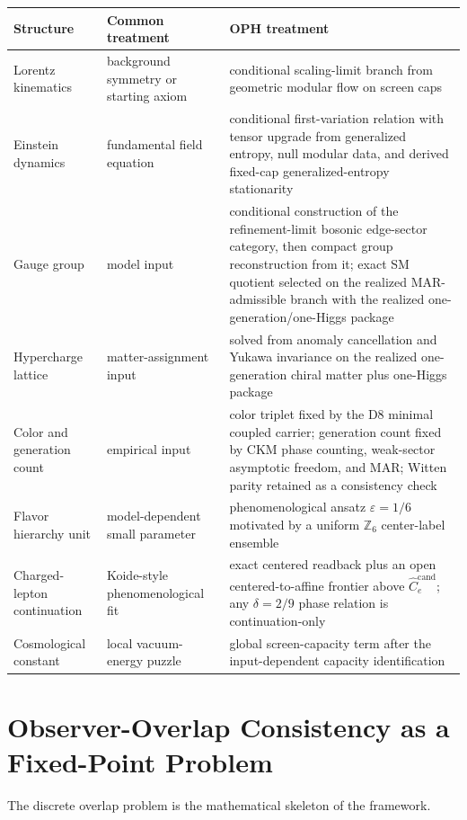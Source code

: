 \documentclass[11pt]{article}
\begin{document}
\begingroup
\footnotesize
\begin{tabular}{@{}>{\raggedright\arraybackslash}p{}>{\raggedright\arraybackslash}p{}>{\raggedright\arraybackslash}p{}@{}}
\toprule
Structure & Common treatment & OPH treatment \\
\midrule
Lorentz kinematics & background symmetry or starting axiom & conditional scaling-limit branch from geometric modular flow on screen caps \\
Einstein dynamics & fundamental field equation & conditional first-variation relation with tensor upgrade from generalized entropy, null modular data, and derived fixed-cap generalized-entropy stationarity \\
Gauge group & model input & conditional construction of the refinement-limit bosonic edge-sector category, then compact group reconstruction from it; exact SM quotient selected on the realized MAR-admissible branch with the realized one-generation/one-Higgs package \\
Hypercharge lattice & matter-assignment input & solved from anomaly cancellation and Yukawa invariance on the realized one-generation chiral matter plus one-Higgs package \\
Color and generation count & empirical input & color triplet fixed by the D8 minimal coupled carrier; generation count fixed by CKM phase counting, weak-sector asymptotic freedom, and MAR; Witten parity retained as a consistency check \\
Flavor hierarchy unit & model-dependent small parameter & phenomenological ansatz \(\varepsilon=1/6\) motivated by a uniform \(\mathbb Z_6\) center-label ensemble \\
Charged-lepton continuation & Koide-style phenomenological fit & exact centered readback plus an open centered-to-affine frontier above \(\widehat C_e^{\mathrm{cand}}\); any \(\delta=2/9\) phase relation is continuation-only \\
Cosmological constant & local vacuum-energy puzzle & global screen-capacity term after the input-dependent capacity identification \\
\bottomrule
\end{tabular}
\endgroup
\section{Observer-Overlap Consistency as a Fixed-Point Problem}

The discrete overlap problem is the mathematical skeleton of the framework.
\end{document}
